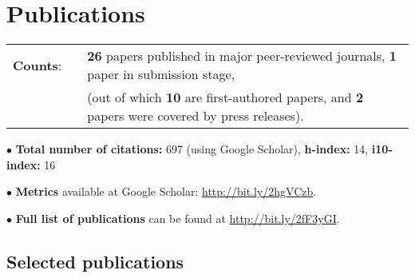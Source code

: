 \documentclass[11pt,letterpaper,sans]{moderncv}
\begin{document}
\vspace{-3mm}
\section{Publications}

\cvitem{}
{
\begin{tabular}{rcl}
\textbf{Counts}: &\hspace{0.3cm} &{\textbf{26} papers published in major peer-reviewed journals}, {\textbf{1} paper in submission stage,} \\
& &{(out of which \textbf{10} are first-authored papers, and \textbf{2} papers were covered by press releases).}
\end{tabular}
}

$\bullet$ \textbf{Total number of citations:} 697 (using Google Scholar), \textbf{h-index:} 14, \textbf{i10-index:} 16

$\bullet$ \textbf{Metrics} available at Google Scholar: {\color{color1} \href{http://bit.ly/2hgVCzb}{http://bit.ly/2hgVCzb}}.

$\bullet$ \textbf{Full list of publications} can be found at {\color{color1} \href{http://bit.ly/2fF3yGI}{http://bit.ly/2fF3yGI}}.

\subsection{Selected publications}
\end{document}
